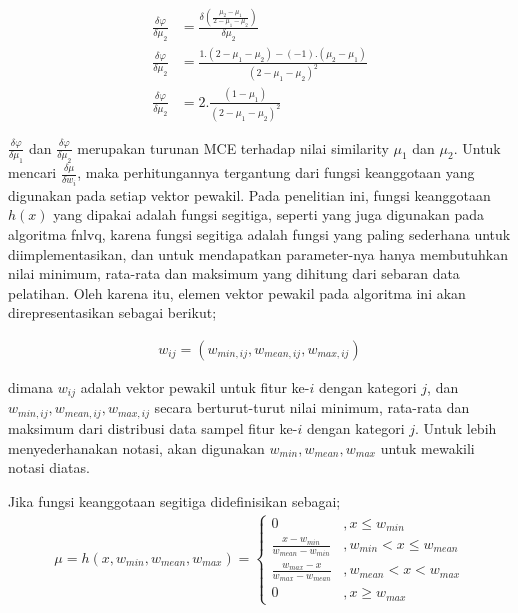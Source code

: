 \begin{align}
\label{eq:turunanmce2}
	\frac{\delta \varphi}{\delta \mu_2} &= 
	\frac{\delta \left(\frac{\mu_2-\mu_1}{2-\mu_1-\mu_2}\right)}{\delta \mu_2} 
	\nonumber \\ \frac{\delta \varphi}{\delta \mu_2} &=  
	\frac{1 . (2 - \mu_1 - \mu_2) - (-1).(\mu_2-\mu_1)}
	{(2 - \mu_1 - \mu_2)^2} \nonumber \\
	\frac{\delta \varphi}{\delta \mu_2} &=  
	2.\frac{(1 - \mu_1)}{(2 - \mu_1 - \mu_2)^2}
\end{align}

$\frac{\delta \varphi}{\delta \mu_1}$ dan $\frac{\delta \varphi}{\delta
\mu_2}$ merupakan turunan MCE terhadap nilai similarity $\mu_1$ dan $\mu_2$.
Untuk mencari $\frac{\delta \mu}{\delta w_i}$, maka perhitungannya tergantung
dari fungsi keanggotaan yang digunakan pada setiap vektor pewakil. Pada
penelitian ini, fungsi keanggotaan $h(x)$ yang dipakai adalah fungsi segitiga,
seperti yang juga digunakan pada algoritma \gls{fnlvq}, karena fungsi segitiga adalah
fungsi yang paling sederhana untuk diimplementasikan, dan untuk mendapatkan
parameter-nya hanya membutuhkan nilai minimum, rata-rata dan maksimum yang
dihitung dari sebaran data pelatihan. Oleh karena itu, elemen vektor pewakil
pada algoritma ini akan direpresentasikan sebagai berikut;

\begin{align}
\label{eq:trimbobot}
	w_{ij} = (w_{min,ij}, w_{mean,ij}, w_{max,ij})
\end{align}

\noindent dimana $w_{ij}$ adalah vektor pewakil untuk fitur ke-$i$ dengan
kategori $j$, dan $w_{min,ij}, w_{mean,ij}, w_{max,ij}$ secara
berturut-turut nilai minimum, rata-rata dan maksimum dari distribusi data sampel
fitur ke-$i$ dengan kategori $j$. Untuk lebih menyederhanakan notasi, akan
digunakan $w_{min}, w_{mean}, w_{max}$ untuk mewakili notasi diatas.

\noindent Jika fungsi keanggotaan segitiga didefinisikan sebagai;
\begin{align}
\label{eq:trim}
	\mu = h(x, w_{min}, w_{mean}, w_{max}) = \left\{ 
	\begin{array}{ll}
	0 & , x \leq w_{min}\\
	\frac{x - w_{min}}{w_{mean} - w_{min}} & , w_{min} < x \leq w_{mean} \\
	\frac{w_{max} - x}{w_{max} - w_{mean}} & , w_{mean} < x < w_{max} \\
	0 & , x \geq w_{max}
	\end{array}
\end{align}


